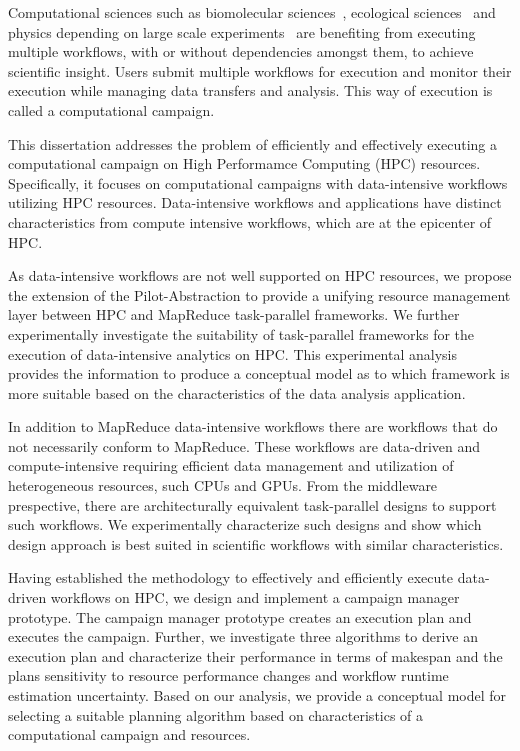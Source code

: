 Computational sciences such as biomolecular 
sciences~\cite{cheatham2015impact, dakka2018concurrent}, ecological 
sciences~\cite{goncalves2020sealnet, paraskevakos2019workflow} and physics 
depending on large scale experiments~\cite{atlas} are benefiting from 
executing multiple workflows, with or without dependencies amongst them, to 
achieve scientific insight. Users submit multiple workflows for execution and 
monitor their execution while managing data transfers and analysis. This way 
of execution is called a computational campaign.

This dissertation addresses the problem of efficiently and effectively 
executing a computational campaign on High Performamce Computing
(HPC) resources. Specifically, it focuses on computational campaigns
with data-intensive workflows utilizing HPC resources. Data-intensive
workflows and applications have distinct characteristics from 
compute intensive workflows, which are at the epicenter of HPC.

As data-intensive workflows are not well supported on HPC resources,
we propose the extension of the Pilot-Abstraction to provide a unifying
resource management layer between HPC and MapReduce task-parallel
frameworks. We further experimentally investigate the suitability of 
task-parallel frameworks for the execution of data-intensive analytics
on HPC. This experimental analysis provides the information to
produce a conceptual model as to which framework is more suitable
based on the characteristics of the data analysis application.

In addition to MapReduce data-intensive workflows there are workflows that
do not necessarily conform to MapReduce. These workflows
are data-driven and compute-intensive requiring efficient data management
and utilization of heterogeneous resources, such CPUs and GPUs. From
the middleware prespective, there are architecturally equivalent
task-parallel designs to support such workflows. We experimentally
characterize such designs and show which design approach is best suited
in scientific workflows with similar characteristics.

Having established the methodology to effectively and efficiently execute
data-driven workflows on HPC, we design and implement a campaign manager
prototype. The campaign manager prototype creates an execution plan and
executes the campaign. Further, we investigate three algorithms to derive an
execution plan and characterize their performance in terms of makespan and
the plans sensitivity to resource performance changes and workflow runtime
estimation uncertainty. Based on our analysis, we provide a conceptual model
for selecting a suitable planning algorithm based on characteristics of a
computational campaign and resources.

